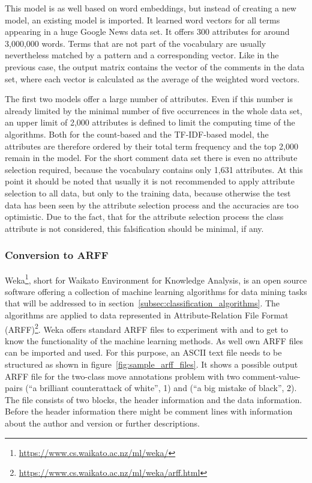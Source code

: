 \documentclass[article,type=msc,colorback,accentcolor=tud7b]{tudthesis}
\begin{document}
\begin{itemize}
        This model is as well based on word embeddings, but instead of creating a new model, an existing model is imported. It learned word vectors for all terms appearing in a huge Google News data set. It offers 300 attributes for around 3,000,000 words. Terms that are not part of the vocabulary are usually nevertheless matched by a pattern and a corresponding vector. Like in the previous case, the output matrix contains the vector of the comments in the data set, where each vector is calculated as the average of the weighted word vectors.
    \end{itemize}
    The first two models offer a large number of attributes. Even if this number is already limited by the minimal number of five occurrences in the whole data set, an upper limit of 2,000 attributes is defined to limit the computing time of the algorithms. Both for the count-based and the TF-IDF-based model, the attributes are therefore ordered by their total term frequency and the top 2,000 remain in the model. For the short comment data set there is even no attribute selection required, because the vocabulary contains only 1,631 attributes. At this point it should be noted that usually it is not recommended to apply attribute selection to all data, but only to the training data, because otherwise the test data has been seen by the attribute selection process and the accuracies are too optimistic. Due to the fact, that for the attribute selection process the class attribute is not considered, this falsification should be minimal, if any.
  
  \subsubsection{Conversion to ARFF}
    Weka\footnote{\url{https://www.cs.waikato.ac.nz/ml/weka/}}, short for Waikato Environment for Knowledge Analysis, is an open source software offering a collection of machine learning algorithms for data mining tasks that will be addressed to in section~\ref{subsec:classification_algorithms}. The algorithms are applied to data represented in Attribute-Relation File Format (ARFF)\footnote{\url{https://www.cs.waikato.ac.nz/ml/weka/arff.html}}. Weka offers standard ARFF files to experiment with and to get to know the functionality of the machine learning methods. As well own ARFF files can be imported and used. For this purpose, an ASCII text file needs to be structured as shown in figure~\ref{fig:sample_arff_files}. It shows a possible output ARFF file for the two-class move annotations problem with two comment-value-pairs (“a brilliant counterattack of white”, 1) and (“a big mistake of black”, 2). The file consists of two blocks, the header information and the data information. Before the header information there might be comment lines with information about the author and version or further descriptions.
    
\end{document}
